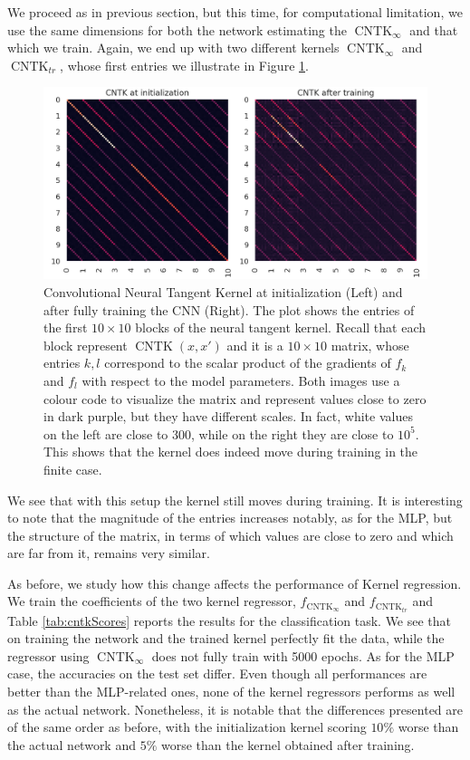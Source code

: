 \documentclass[11pt,notitlepage]{article}
\numberwithin{equation}{section}
\DeclareMathOperator{\CNTK}{CNTK}
\theoremstyle{remark}
\theoremstyle{definition}
\begin{document}
	We proceed as in previous section, but this time, for computational limitation, we use the same dimensions for both the network estimating the $\CNTK_\infty$ and that which we train.
	Again, we end up with two different kernels $\CNTK_\infty$ and $\CNTK_{tr}$, whose first entries we illustrate in Figure \ref{fig:cntk_before_after_tr}.
	\begin{figure}
		\includegraphics[width=\linewidth]{../Simulations/figures/cntk_before_after_tr.png}
		\caption{Convolutional Neural Tangent Kernel at initialization (Left) and after fully training the CNN (Right).
			The plot shows the entries of the first $10 \times 10$ blocks of the neural tangent kernel.
			Recall that each block represent $\CNTK(x, x')$ and it is a $10 \times 10$ matrix, whose entries $k,l$ correspond to the scalar product of the gradients of $f_k$ and $f_l$ with respect to the model parameters. 
			Both images use a colour code to visualize the matrix and represent values close to zero in dark purple, but they have different scales.
			In fact, white values on the left are close to 300, while on the right they are close to $10^5$.
			This shows that the kernel does indeed move during training in the finite case.}
		\label{fig:cntk_before_after_tr}        
	\end{figure}
	
	We see that with this setup the kernel still moves during training.
	It is interesting to note that the magnitude of the entries increases notably, as for the MLP, but the structure of the matrix, in terms of which values are close to zero and which are far from it, remains very similar.
	
	As before, we study how this change affects the performance of Kernel regression.
	We train the coefficients of the two kernel regressor, $f_{\CNTK_\infty}$ and $f_{\CNTK_{tr}}$ and
	Table \ref{tab:cntkScores} reports the results for the classification task.
	We see that on training the network and the trained kernel perfectly fit the data, while the regressor using $\CNTK_\infty$ does not fully train with 5000 epochs.
	As for the MLP case, the accuracies on the test set differ.
	Even though all performances are better than the MLP-related ones, none of the kernel regressors performs as well as the actual network.
	Nonetheless, it is notable that the differences presented are of the same order as before, with the initialization kernel scoring $10\%$ worse than the actual network and $5\%$ worse than the kernel obtained after training.
	
\end{document}
